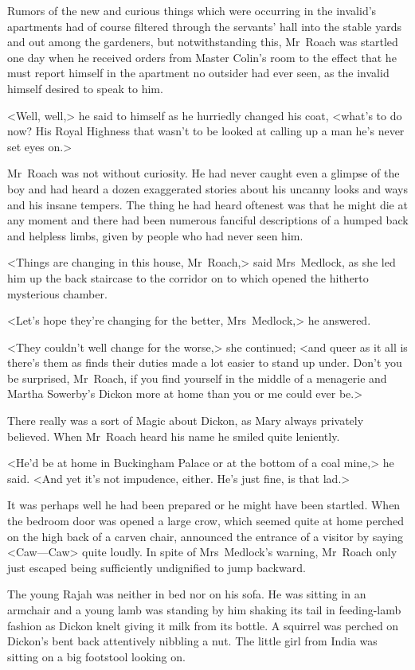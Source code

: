 Rumors of the new and curious things which were occurring in the invalid's apartments had of course filtered through the servants' hall into the stable yards and out among the gardeners, but notwithstanding this, Mr~Roach was startled one day when he received orders from Master Colin's room to the effect that he must report himself in the apartment no outsider had ever seen, as the invalid himself desired to speak to him.

<Well, well,> he said to himself as he hurriedly changed his coat, <what's to do now? His Royal Highness that wasn't to be looked at calling up a man he's never set eyes on.>

Mr~Roach was not without curiosity. He had never caught even a glimpse of the boy and had heard a dozen exaggerated stories about his uncanny looks and ways and his insane tempers. The thing he had heard oftenest was that he might die at any moment and there had been numerous fanciful descriptions of a humped back and helpless limbs, given by people who had never seen him.

<Things are changing in this house, Mr~Roach,> said Mrs~Medlock, as she led him up the back staircase to the corridor on to which opened the hitherto mysterious chamber.

<Let's hope they're changing for the better, Mrs~Medlock,> he answered.

<They couldn't well change for the worse,> she continued; <and queer as it all is there's them as finds their duties made a lot easier to stand up under. Don't you be surprised, Mr~Roach, if you find yourself in the middle of a menagerie and Martha Sowerby's Dickon more at home than you or me could ever be.>

There really was a sort of Magic about Dickon, as Mary always privately believed. When Mr~Roach heard his name he smiled quite leniently.

<He'd be at home in Buckingham Palace or at the bottom of a coal mine,> he said. <And yet it's not impudence, either. He's just fine, is that lad.>

It was perhaps well he had been prepared or he might have been startled. When the bedroom door was opened a large crow, which seemed quite at home perched on the high back of a carven chair, announced the entrance of a visitor by saying <Caw—Caw> quite loudly. In spite of Mrs~Medlock's warning, Mr~Roach only just escaped being sufficiently undignified to jump backward.

The young Rajah was neither in bed nor on his sofa. He was sitting in an armchair and a young lamb was standing by him shaking its tail in feeding-lamb fashion as Dickon knelt giving it milk from its bottle. A squirrel was perched on Dickon's bent back attentively nibbling a nut. The little girl from India was sitting on a big footstool looking on.


